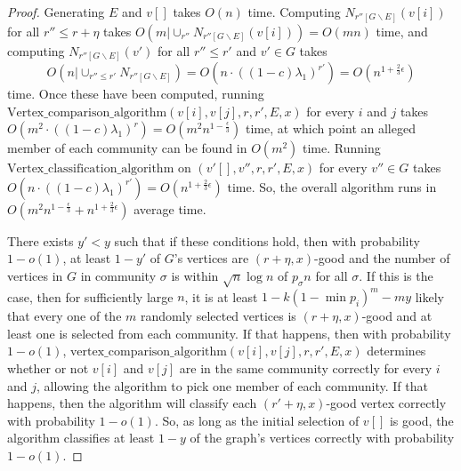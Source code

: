\documentclass[11pt]{article}
\newcommand{\1}{\mathbb{1}}
\begin{document}
\begin{proof}
Generating $E$ and $v[]$ takes $O(n)$ time. Computing $N_{r''[G\backslash E]}(v[i])$ for all $r''\le r+\eta$ takes $O(m|\cup_{r''} N_{r''[G\backslash E]}(v[i]))=O(mn)$ time, and computing $N_{r''[G\backslash E]}(v')$ for all $r''\le r'$ and $v'\in G$ takes $$O(n|\cup_{r''\le r'} N_{r''[G\backslash E]})=O(n\cdot ((1-c)\lambda_1)^{r'})=O(n^{1+\frac{2}{3}\epsilon})$$ time. Once these have been computed, running $\text{Vertex\_comparison\_algorithm}(v[i],v[j],r,r',E,x)$ for every $i$ and $j$ takes $O(m^2\cdot ((1-c)\lambda_1)^r)= O(m^2 n^{1-\frac{\epsilon}{3}})$ time, at which point an alleged member of each community can be found in $O(m^2)$ time.  Running $\text{Vertex\_classification\_algorithm}$ on $(v'[],v'', r,r',E,x)$ for every $v''\in G$ takes $O(n\cdot ((1-c)\lambda_1)^{r'})=O(n^{1+\frac{2}{3}\epsilon})$ time. So, the overall algorithm runs in $O(m^2n^{1-\frac{\epsilon}{3}}+n^{1+\frac{2}{3}\epsilon})$ average time.

There exists $y'<y$ such that if these conditions hold, then with probability $1-o(1)$, at least $1-y'$ of $G$'s vertices are $(r+\eta,x)$-good and the number of vertices in $G$ in community $\sigma$ is within $\sqrt{n}\log n$ of $p_\sigma n$ for all $\sigma$. If this is the case, then for sufficiently large $n$, it is at least $1-k(1-\min p_i)^m-my$ likely that every one of the $m$ randomly selected vertices is $(r+\eta,x)$-good and at least one is selected from each community. If that happens, then with probability $1-o(1)$, $\text{vertex\_comparison\_algorithm}(v[i],v[j],r,r',E,x)$ determines whether or not $v[i]$ and $v[j]$ are in the same community correctly for every $i$ and $j$, allowing the algorithm to pick one member of each community. If that happens, then the algorithm will classify each $(r'+\eta,x)$-good vertex correctly with probability $1-o(1)$. So, as long as the initial selection of $v[]$ is good, the algorithm classifies at least $1-y$ of the graph's vertices correctly with probability $1-o(1)$.
\end{proof}
\end{document}
